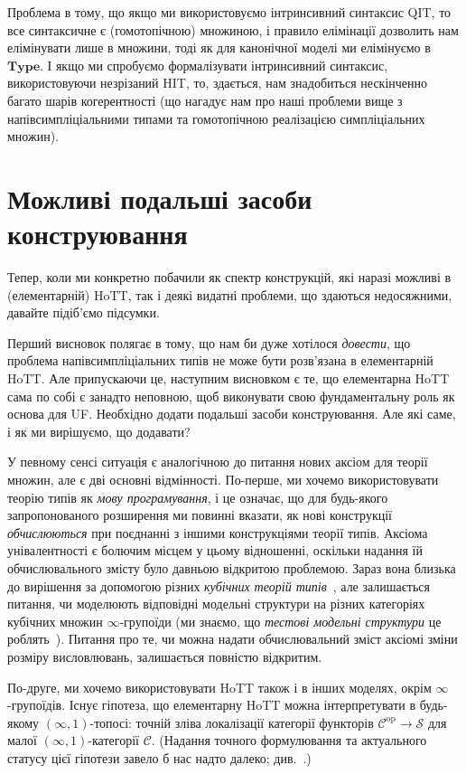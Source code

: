 \documentclass[12pt]{article}
\newcommand*{\calC}{\mathcal{C}}
\newcommand*{\calS}{\mathcal{S}}
\newcommand*{\inftyone}{\ensuremath{(\infty,1)}}
\newcommand*{\Type}{\ensuremath{\mathbf{Type}}}
\newcommand*{\op}{^{\mathrm{op}}}
\begin{document}
Проблема в тому, що якщо ми використовуємо інтринсивний синтаксис QIT, то все синтаксичне є (гомотопічною) множиною, і правило елімінації дозволить нам елімінувати лише в множини, тоді як для канонічної моделі ми елімінуємо в $\Type$. І якщо ми спробуємо формалізувати інтринсивний синтаксис, використовуючи незрізаний HIT, то, здається, нам знадобиться нескінченно багато шарів когерентності (що нагадує нам про наші проблеми вище з напівсимпліціальними типами та гомотопічною реалізацією симпліціальних множин).

\section{Можливі подальші засоби конструювання}
\label{sec:solutions}

Тепер, коли ми конкретно побачили як спектр конструкцій, які наразі можливі в (елементарній) HoTT, так і деякі видатні проблеми, що здаються недосяжними, давайте підіб'ємо підсумки.

Перший висновок полягає в тому, що нам би дуже хотілося \emph{довести}, що проблема напівсимпліціальних типів не може бути розв'язана в елементарній HoTT. Але припускаючи це, наступним висновком є те, що елементарна HoTT сама по собі є занадто неповною, щоб виконувати свою фундаментальну роль як основа для UF. Необхідно додати подальші засоби конструювання. Але які саме, і як ми вирішуємо, що додавати?

У певному сенсі ситуація є аналогічною до питання нових аксіом для теорії множин, але є дві основні відмінності. По-перше, ми хочемо використовувати теорію типів як \emph{мову програмування}, і це означає, що для будь-якого запропонованого розширення ми повинні вказати, як нові конструкції \emph{обчислюються} при поєднанні з іншими конструкціями теорії типів. Аксіома унівалентності є болючим місцем у цьому відношенні, оскільки надання їй обчислювального змісту було давньою відкритою проблемою. Зараз вона близька до вирішення за допомогою різних \emph{кубічних теорій типів}~\cite{Angiuli-Harper-Wilson2017,Bezem-Coquand-Huber2014,CCHM2018}, але залишається питання, чи моделюють відповідні модельні структури на різних категоріях кубічних множин $\infty$-групоїди (ми знаємо, що \emph{тестові модельні структури} це роблять~\cite{BuchholtzMorehouse2017}). Питання про те, чи можна надати обчислювальний зміст аксіомі зміни розміру висловлювань, залишається повністю відкритим.

По-друге, ми хочемо використовувати HoTT також і в інших моделях, окрім $\infty$-групоїдів. Існує гіпотеза, що елементарну HoTT можна інтерпретувати в будь-якому \inftyone-топосі: точній зліва локалізації категорії функторів $\calC\op\to\calS$ для малої \inftyone-категорії $\calC$. (Надання точного формулювання та актуального статусу цієї гіпотези завело б нас надто далеко; див.~\cite{HoTTWikiTopos}.)
\end{document}
